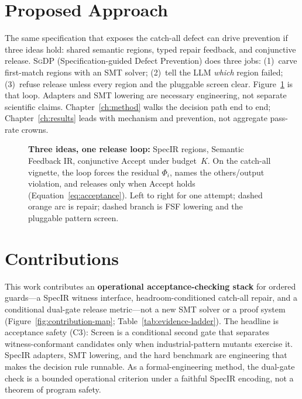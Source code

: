 \section{Proposed Approach}
\label{sec:intro:approach}

The same specification that exposes the catch-all defect can drive prevention
if three ideas hold: shared semantic regions, typed repair feedback, and
conjunctive release.
\textsc{SgDP} (Specification-guided Defect Prevention) does three jobs:
(1)~carve first-match regions with an SMT solver; (2)~tell the LLM
\emph{which} region failed; (3)~refuse release unless every region and the
pluggable screen clear.
Figure~\ref{fig:sgdp-overview} is that loop.
Adapters and SMT lowering are necessary engineering, not separate scientific
claims.
Chapter~\ref{ch:method} walks the decision path end to end;
Chapter~\ref{ch:results} leads with mechanism and prevention, not aggregate
pass-rate crowns.

\begin{figure}[t]
  \centering
  \caption{\textbf{Three ideas, one release loop:} SpecIR regions, Semantic
    Feedback IR, conjunctive $\mathrm{Accept}$ under budget~$K$.
    On the catch-all vignette, the loop forces the residual $\Phi_i$, names
    the others/output violation, and releases only when Accept holds
    (Equation~\eqref{eq:acceptance}).
    Left to right for one attempt; dashed orange arc is repair; dashed branch
    is FSF lowering and the pluggable pattern screen.}
  \label{fig:sgdp-overview}
\end{figure}


\section{Contributions}
\label{sec:intro:contributions}

This work contributes an \textbf{operational acceptance-checking stack} for
ordered guards---a SpecIR witness interface, headroom-conditioned catch-all
repair, and a conditional dual-gate release metric---not a new SMT solver or a
proof system (Figure~\ref{fig:contribution-map};
Table~\ref{tab:evidence-ladder}).
The headline is acceptance safety (C3): Screen is a conditional second gate
that separates witness-conformant candidates only when industrial-pattern
mutants exercise it.
SpecIR adapters, SMT lowering, and the hard benchmark are engineering that
makes the decision rule runnable.
As a formal-engineering method, the dual-gate check is a bounded operational
criterion under a faithful SpecIR encoding, not a theorem of program safety.

